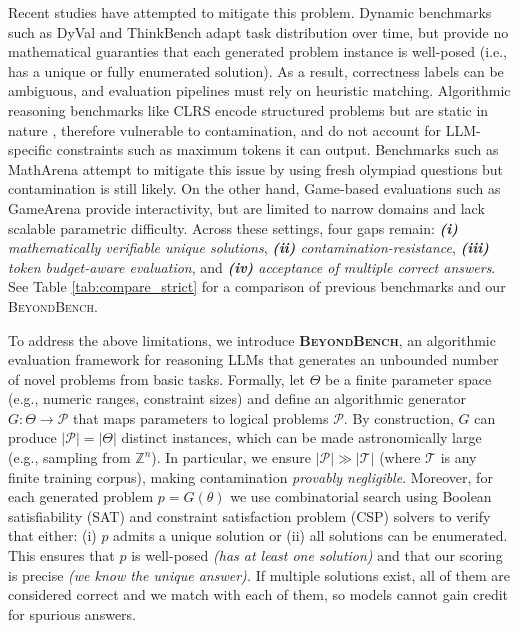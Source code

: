 \documentclass{article} %
\theoremstyle{plain}
\theoremstyle{definition}
\newcommand{\our}{\textsc{BeyondBench}\xspace}
\newcommand{\ourbold}{\textbf{\textsc{BeyondBench}}\xspace}
\begin{document}
Recent studies have attempted to mitigate this problem. Dynamic benchmarks such as DyVal \citep{zhu2023dyval,zhu2024dyval2} and ThinkBench \citep{huang2025thinkbench} adapt task distribution over time, but provide no mathematical guaranties that each generated problem instance is well-posed (i.e., has a unique or fully enumerated solution). As a result, correctness labels can be ambiguous, and evaluation pipelines must rely on heuristic matching. Algorithmic reasoning benchmarks like CLRS encode structured problems but are static in nature \citep{velickovic2022clrs}, therefore vulnerable to contamination, and do not account for LLM-specific constraints such as maximum tokens it can output. Benchmarks such as MathArena \citep{balunovic2025matharena} attempt to mitigate this issue by using fresh olympiad questions but contamination is still likely. On the other hand, Game-based evaluations such as GameArena \citep{gamearena2024} provide interactivity, but are limited to narrow domains and lack scalable parametric difficulty. Across these settings, four gaps remain: \emph{\textbf{(i)} mathematically verifiable unique solutions}, \emph{\textbf{(ii)} contamination-resistance}, \emph{\textbf{(iii)} token budget-aware evaluation}, and \emph{\textbf{(iv)} acceptance of multiple correct answers}. See Table \ref{tab:compare_strict} for a comparison of previous benchmarks and our \our.



To address the above limitations, we introduce \ourbold, an algorithmic evaluation framework for reasoning LLMs that generates an unbounded number of novel problems from basic tasks.  Formally, let $\Theta$ be a finite parameter space (e.g., numeric ranges, constraint sizes) and define an algorithmic generator $G:\Theta\to\mathcal P$ that maps parameters to logical problems $\mathcal P$.  By construction, $G$ can produce $|\mathcal P|=|\Theta|$ distinct instances, which can be made astronomically large (e.g., sampling from $\mathbb Z^n$).  In particular, we ensure $|\mathcal P|\gg|\mathcal T|$ (where $\mathcal T$ is any finite training corpus), making contamination \textit{provably negligible}. Moreover, for each generated problem $p=G(\theta)$ we use combinatorial search using Boolean satisfiability (SAT) and constraint satisfaction problem (CSP) solvers \citep{walsh2000sat} to verify that either: (i) $p$ admits a unique solution or (ii) all solutions can be enumerated. This ensures that $p$ is well-posed \textit{(has at least one solution)} and that our scoring is precise \textit{(we know the unique answer).} If multiple solutions exist, all of them are considered correct and we match with each of them, so models cannot gain credit for spurious answers.
\end{document}
